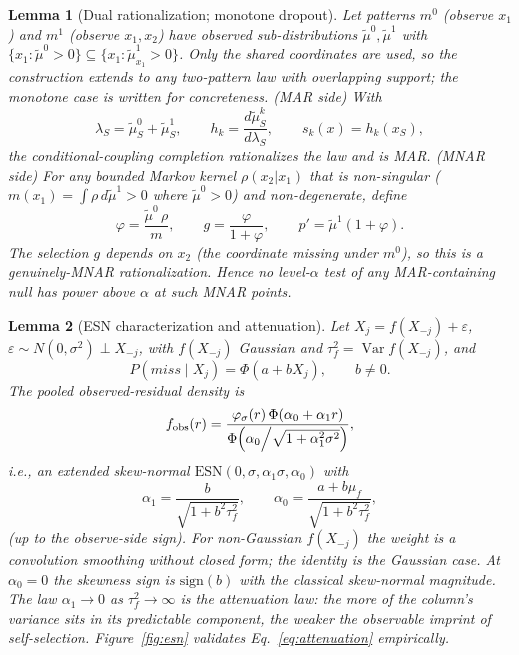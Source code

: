 \documentclass[conference]{IEEEtran}
\DeclareMathOperator{\Var}{Var}
\newtheorem{lemma}{Lemma}
\begin{document}
\begin{lemma}[Dual rationalization; monotone dropout]\label{lem:dual}
Let patterns $m^0$ (observe $x_1$) and $m^1$ (observe $x_1,x_2$) have observed sub-distributions
$\tilde\mu^0,\tilde\mu^1$ with $\{x_1:\tilde\mu^0>0\}\subseteq\{x_1:\tilde\mu^1_{x_1}>0\}$.
Only the shared coordinates are used, so the construction extends to any two-pattern law with
overlapping support; the monotone case is written for concreteness.
\emph{(MAR side)} With
\begin{equation}
\lambda_S=\tilde\mu^0_S+\tilde\mu^1_S,\qquad
h_k=\frac{d\tilde\mu^k_S}{d\lambda_S},\qquad
s_k(x)=h_k(x_S),
\label{eq:mar_constr}
\end{equation}
the conditional-coupling completion rationalizes the law and is MAR.
\emph{(MNAR side)} For any bounded Markov kernel $\rho(x_2|x_1)$ that is non-singular
($m(x_1)=\int\rho\,d\tilde\mu^1>0$ where $\tilde\mu^0>0$) and non-degenerate, define
\begin{equation}
\varphi=\frac{\tilde\mu^0\,\rho}{m},\qquad
g=\frac{\varphi}{1+\varphi},\qquad
p'=\tilde\mu^1(1+\varphi).
\label{eq:mnar_constr}
\end{equation}
The selection $g$ depends on $x_2$ (the coordinate missing under $m^0$), so this is a
genuinely-MNAR rationalization. Hence no level-$\alpha$ test of any MAR-containing null has power above $\alpha$
at such MNAR points.
\end{lemma}

\begin{lemma}[ESN characterization and attenuation]\label{lem:esn}
Let $X_j=f(X_{-j})+\varepsilon$, $\varepsilon\sim N(0,\sigma^2)\perp X_{-j}$,
with $f(X_{-j})$ Gaussian and $\tau_f^2=\Var f(X_{-j})$, and
\begin{equation}
P(\mathit{miss}\mid X_j)=\Phi(a+bX_j),\qquad b\ne0.
\label{eq:selection_model}
\end{equation}
The pooled observed-residual density is
\begin{equation}
f_{\mathrm{obs}}(r)=\frac{\varphi_\sigma(r)\,\Phi(\alpha_0+\alpha_1 r)}
{\Phi\!\left(\alpha_0\middle/\sqrt{1+\alpha_1^2\sigma^2}\right)},
\label{eq:esn_density}
\end{equation}
i.e., an extended skew-normal $\mathrm{ESN}(0,\sigma,\alpha_1\sigma,\alpha_0)$ with
\begin{equation}
\alpha_1=\frac{b}{\sqrt{1+b^2\tau_f^2}},\qquad
\alpha_0=\frac{a+b\mu_f}{\sqrt{1+b^2\tau_f^2}},
\label{eq:attenuation}
\end{equation}
(up to the observe-side sign). For non-Gaussian $f(X_{-j})$ the weight is a convolution
smoothing without closed form; the identity is the Gaussian case. At $\alpha_0=0$ the skewness sign is $\mathrm{sign}(b)$ with the
classical skew-normal magnitude. The law $\alpha_1\to0$ as $\tau_f^2\to\infty$ is the
\emph{attenuation law}: the more of the column's variance sits in its predictable component, the
weaker the observable imprint of self-selection. Figure~\ref{fig:esn} validates
Eq.~\eqref{eq:attenuation} empirically.
\end{lemma}
\end{document}
